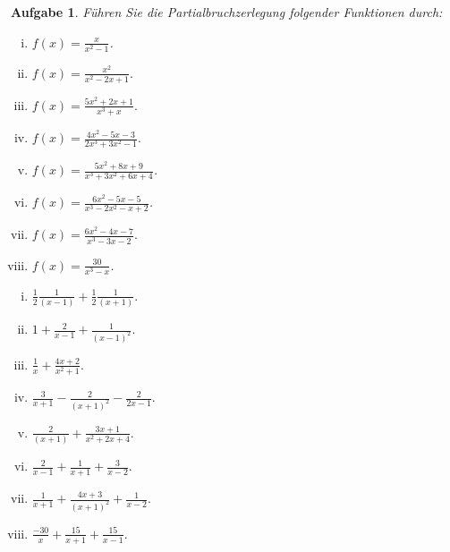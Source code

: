 \documentclass[a4paper, 20]{exam}
\newtheorem{ex}{Aufgabe}
\begin{document}
\begin{ex} Führen Sie die Partialbruchzerlegung folgender Funktionen durch:
\begin{enumerate}[i)]
\item $f(x) = \frac{x}{x^2-1}$.
\item $f(x) = \frac{x^2}{x^2-2x+1}.$
\item $f(x) = \frac{5x^2+2x+1}{x^3+x}.$
\item $f(x) = \frac{4x^2-5x-3}{2x^3+3x^2-1}.$
\item $f(x) = \frac{5x^2+8x+9}{x^3+3x^2+6x+4}$.
\item $f(x) = \frac{6x^2-5x-5}{x^3-2x^2-x+2}$.
\item $f(x)= \frac{6x^2-4x-7}{x^3-3x-2}.$
\item $f(x) = \frac{30}{x^3-x}$.
\end{enumerate}
\end{ex}

\begin{solution}
\begin{enumerate}[i)]
\item $\frac{1}{2} \frac{1}{(x-1)}+ \frac{1}{2} \frac{1}{(x+1)}$.
\item $1 + \frac{2}{x-1} + \frac{1}{(x-1)^2}$.
\item $\frac{1}{x}+ \frac{4x+2}{x^2+1}$.
\item $\frac{3}{x+1}- \frac{2}{(x+1)^2}- \frac{2}{2x-1}$.
\item $\frac{2}{(x+1)}+ \frac{3x+1}{x^2+2x+4}$.
\item $\frac{2}{x-1} + \frac{1}{x+1}+ \frac{3}{x-2}$.
\item $\frac{1}{x+1}+ \frac{4x+3}{(x+1)^2} + \frac{1}{x-2}$.
\item $\frac{-30}{x} + \frac{15}{x+1}+ \frac{15}{x-1}$.
\end{enumerate}
\end{solution}
\end{document}
